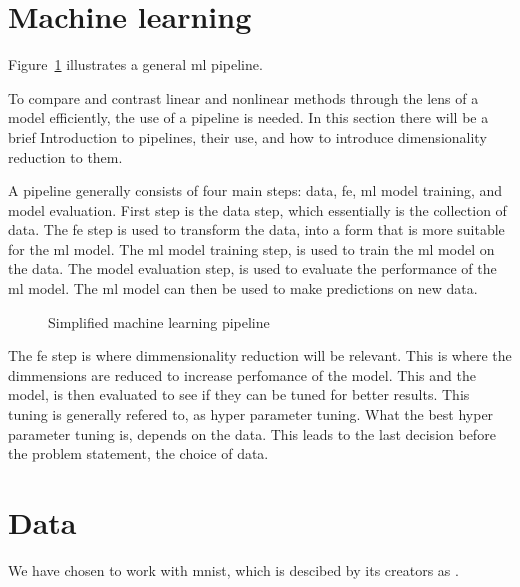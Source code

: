 \section{Machine learning}\label{sec:machine-learning}

Figure~\ref{fig:basic-machine-learning-pipeline} illustrates a general \gls{ml} pipeline.

To compare and contrast linear and nonlinear methods through the lens of a model efficiently, the use of a pipeline is needed. In this section there will be a brief Introduction to pipelines, their use, and how to introduce dimensionality reduction to them.

A pipeline generally consists of four main steps: data, \gls{fe}, \gls{ml} model training, and model evaluation. First step is the data step, which essentially is the collection of data. The \gls{fe} step is used to transform the data, into a form that is more suitable for the \gls{ml} model. The \gls{ml} model training step, is used to train the \gls{ml} model on the data. The model evaluation step, is used to evaluate the performance of the \gls{ml} model. The \gls{ml} model can then be used to make predictions on new data. 

\begin{figure}[htb!]
    \centering
        
    \caption{Simplified machine learning pipeline}
    \label{fig:basic-machine-learning-pipeline}
 \end{figure}

The \gls{fe} step is where dimmensionality reduction will be relevant. This is where the dimmensions are reduced to increase perfomance of the model. This and the model, is then evaluated to see if they can be tuned for better results. This tuning is generally refered to, as hyper parameter tuning. What the best hyper parameter tuning is, depends on the data. This leads to the last decision before the problem statement, the choice of data.

\section{Data}\label{sec:data}
We have chosen to work with \gls{mnist}, which is descibed by its creators as
.


